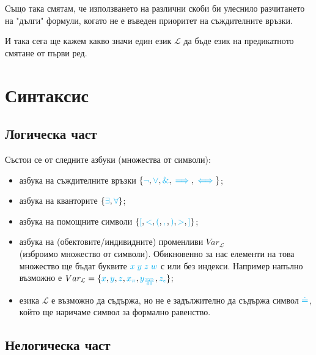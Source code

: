 \documentclass{article}[12pt]
\newcommand{\Lang}{\mathcal{L}}
\begin{document}
Също така смятам, че използването на различни скоби би улеснило
разчитането на "дълги" формули, когато не е въведен приоритет на съждителните връзки.

\vspace{0.5cm}

И така сега ще кажем какво значи един език \(\Lang\) да бъде език на предикатното смятане от първи ред.

\section{Синтаксис}

\subsection{Логическа част}

Състои се от следните азбуки (множества от символи):

\begin{itemize}
\item азбука на съждителните връзки
\(\{\color{cyan}\lnot \color{black}, \color{cyan} \lor \color{black} , \color{cyan} \& \color{black} , \color{cyan}\implies \color{black} , \color{cyan}\iff \color{black} \}\);
\item азбука на кванторите
\(\{\color{cyan}\exists \color{black}, \color{cyan} \forall \color{black} \}\);
\item азбука на помощните символи
\(\{\color{cyan} [ \color{black}, \color{cyan} < \color{black} , \color{cyan} ( \color{black} , \color{cyan} , \color{black} , \color{cyan} ) \color{black} , \color{cyan} > \color{black} , \color{cyan} ] \color{black} \}\);
\item азбука на (обектовите/индивидните) променливи \(Var_\Lang\) \\
(изброимо множество от символи). 
Обикновенно за нас елементи на това множество ще бъдат буквите \(\color{cyan} x \; y \; z \; w\) с или без индекси.
Например напълно възможно е \(Var_\Lang = \{\color{cyan} x \color{black}, \color{cyan} y \color{black} , \color{cyan} z \color{black} , \color{cyan} x_\pi \color{black} , \color{cyan} y_{\frac{325}{66}} \color{black} , \color{cyan} z_{\epsilon} \color{black} \}\);
\item езика \(\Lang\) е възможно да съдържа, но не е задължително да съдържа символ \(\color{cyan}\doteq\),
който ще наричаме символ за формално равенство.
\end{itemize}

\subsection{Нелогическа част}
\end{document}

